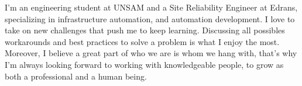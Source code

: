 

\begin{cvparagraph}

    I'm an engineering student at UNSAM and a Site Reliability Engineer at Edrans, specializing in infrastructure automation, and automation development.
    I love to take on new challenges that push me to keep learning.
    Discussing all possibles workarounds and best practices to solve a problem is what I enjoy the most.
    Moreover, I believe a great part of who we are is whom we hang with, that's why I'm always looking forward to working with knowledgeable people, to grow as both a professional and a human being.
\end{cvparagraph}
